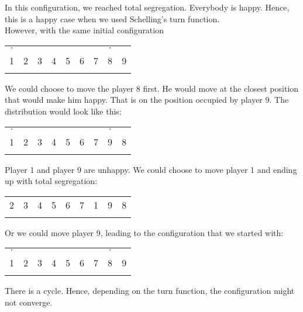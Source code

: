 \documentclass[../main.tex]{subfiles}
\begin{document}
In this configuration, we reached total segregation. Everybody is happy. Hence, this is a happy case when we used Schelling's turn function.\\

However, with the same initial configuration
\begin{table}[H]
\begin{center}
{\begin{tabular}{| c |c| c| c| c |c| c |c| c |}
\hline
$\cdot$ &  & & & &  & & $\cdot$ & \\
1 & 2 &3 &4 &5 &6  &7 &8 &9 \\
\x &\z &\z &\z &\z  &\z &\z &\x & \x \\
 \hline
\end{tabular}}
\end{center}
\end{table}

We could choose to move the player 8 first. He would move at the closest position that would make him happy. That is on the position occupied by player 9. The distribution would look like this:
\begin{table}[H]
\begin{center}
{\begin{tabular}{| c |c| c| c| c |c| c |c| c |}
\hline
$\cdot$ &  & & & &  & & $\cdot$ & \\
1 & 2 &3 &4 &5 &6  &7 &9 &8 \\
\x &\z &\z &\z &\z  &\z &\z &\x & \x \\
 \hline
\end{tabular}}
\end{center}
\end{table}

Player 1 and player 9 are unhappy. We could choose to move player 1 and ending up with total segregation:

\begin{table}[H]
\begin{center}
{\begin{tabular}{| c |c| c| c| c |c| c |c| c |}
\hline
 2 &3 &4 &5 &6  &7 &1 &9 &8 \\
\z &\z &\z &\z  &\z &\z &\x &\x & \x \\
 \hline
\end{tabular}}
\end{center}
\end{table}

Or we could move player 9, leading to the configuration that we started with:
\begin{table}[H]
\begin{center}
{\begin{tabular}{| c |c| c| c| c |c| c |c| c |}
\hline
$\cdot$ &  & & & &  & & $\cdot$ & \\
1 & 2 &3 &4 &5 &6  &7 &8 &9 \\
\x &\z &\z &\z &\z  &\z &\z &\x & \x \\
 \hline
\end{tabular}}
\end{center}
\end{table}
There is a cycle. Hence, depending on the turn function, the configuration might not converge.\\
\end{document}
